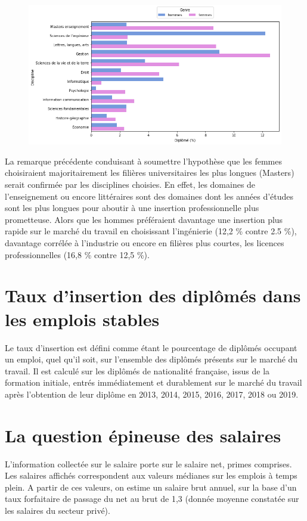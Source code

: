 \documentclass[12pt, a4paper, titlepage, table]{article}
\begin{document}
	\begin{figure}[H]
		\centering
		\includegraphics[width=1\textwidth]{../graphs/proportion_disciplines.png}
		\label{fig:genre_discipline}
	\end{figure}

	La remarque précédente conduisant à soumettre l'hypothèse que les femmes choisiraient majoritairement les filières universitaires les plus longues (Masters) serait confirmée par les disciplines choisies.
	En effet, les domaines de l'enseignement ou encore littéraires sont des domaines dont les années d'études sont les plus longues pour aboutir à une insertion professionnelle plus prometteuse.
	Alors que les hommes préféraient davantage une insertion plus rapide sur le marché du travail en choisissant l'ingénierie (12,2 \% contre 2.5 \%), davantage corrélée à l'industrie ou encore en filières plus courtes, les licences professionnelles (16,8 \% contre 12,5 \%). 

\section{Taux d'insertion des diplômés dans les emplois stables}

Le taux d’insertion est défini comme étant le pourcentage de diplômés occupant un emploi, quel qu’il soit, sur l’ensemble des diplômés présents sur le marché du travail. Il est calculé sur les diplômés de nationalité française, issus de la formation initiale, entrés immédiatement et durablement sur le marché du travail après l’obtention de leur diplôme en 2013, 2014, 2015, 2016, 2017, 2018 ou 2019.


\section{La question épineuse des salaires}
L’information collectée sur le salaire porte sur le salaire net, primes comprises. Les salaires affichés correspondent aux valeurs médianes sur les emplois à temps plein. A partir de ces valeurs, on estime un salaire brut annuel, sur la base d’un taux forfaitaire de passage du net au brut de 1,3 (donnée moyenne constatée sur les salaires du secteur privé).
\end{document}

